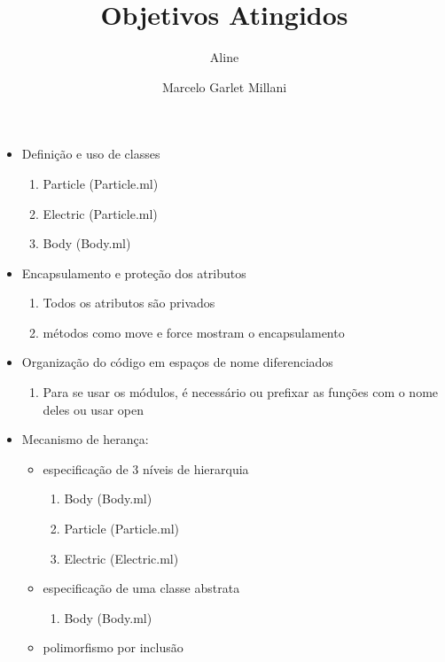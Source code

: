 \documentclass[a4paper,10pt]{article}
\title{Objetivos Atingidos}
\author{Aline \and Marcelo Garlet Millani}
\begin{document}
\maketitle

\section{}

\begin{itemize}
 \item Definição e uso de classes
		{\color{done}
		\begin{enumerate}
			\item Particle (Particle.ml)
			\item Electric (Particle.ml)
			\item Body (Body.ml)
		\end{enumerate}
		}
 \item Encapsulamento e proteção dos atributos
	{\color{done}
		\begin{enumerate}
			\item Todos os atributos são privados
			\item métodos como move e force mostram o encapsulamento
		\end{enumerate}
		}
 \item Organização do código em espaços de nome diferenciados
	{\color{done}
		\begin{enumerate}
			\item Para se usar os módulos, é necessário ou prefixar as funções com o nome deles ou usar open
		\end{enumerate}
		}
 \item Mecanismo de herança:
	\begin{itemize}
	 \item especificação de 3 níveis de hierarquia
		{\color{done}
		\begin{enumerate}
			\item Body (Body.ml)
			\item Particle (Particle.ml)
			\item Electric (Electric.ml)
		\end{enumerate}
		}
	 \item especificação de uma classe abstrata
		{\color{done}
		\begin{enumerate}
			\item Body (Body.ml)
		\end{enumerate}
		}
	 \item polimorfismo por inclusão

\end{itemize}
\end{itemize}
\end{document}

